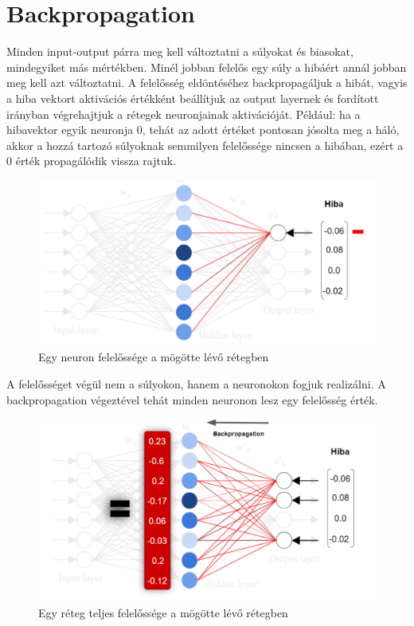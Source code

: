 \section{Backpropagation}

Minden input-output párra meg kell változtatni a súlyokat és biasokat, mindegyiket más mértékben. Minél jobban felelős egy súly a hibáért annál jobban meg kell azt változtatni. A felelősség eldöntéséhez backpropagáljuk a hibát, vagyis a hiba vektort aktivációs értékként beállítjuk az output layernek és fordított irányban végrehajtjuk a rétegek neuronjainak aktivációját.
Például: ha a hibavektor egyik neuronja $0$, tehát az adott értéket pontosan jósolta meg a háló, akkor a hozzá tartozó súlyoknak semmilyen felelőssége nincsen a hibában, ezért a $0$ érték propagálódik vissza rajtuk.

\begin{figure}[h!]
  
	\begin{center}
	\includegraphics[width=.8\linewidth]{backprop_single_error.png}
	\end{center}
	
  \caption{Egy neuron felelőssége a mögötte lévő rétegben}
\end{figure}

A felelősséget végül nem a súlyokon, hanem a neuronokon fogjuk realizálni. A backpropagation végeztével tehát minden neuronon lesz egy felelősség érték.

\begin{figure}[h!]
  
	\begin{center}
	\includegraphics[width=.8\linewidth]{backprop_all_error.png}
	\end{center}
	
  \caption{Egy réteg teljes felelőssége a mögötte lévő rétegben}
\end{figure}

